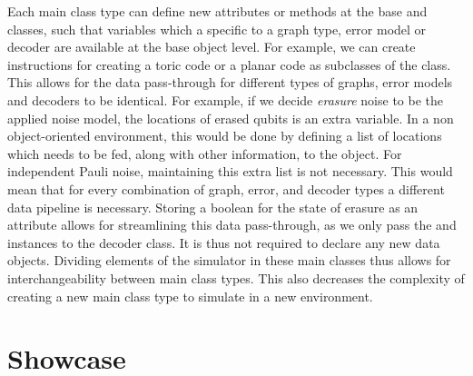Each main class type can define new attributes or methods at the base  and  classes, such that variables which a specific to a graph type, error model or decoder are available at the base object level. For example, we can create instructions for creating a toric code or a planar code as subclasses of the  class. This allows for the data pass-through for different types of graphs, error models and decoders to be identical. For example, if we decide \emph{erasure} noise to be the applied noise model, the locations of erased qubits is an extra variable. In a non object-oriented environment, this would be done by defining a list of locations which needs to be fed, along with other information, to the  object. For independent Pauli noise, maintaining this extra list is not necessary. This would mean that for every combination of graph, error, and decoder types a different data pipeline is necessary. Storing a boolean for the state of erasure as an attribute  allows for streamlining this data pass-through, as we only pass the  and  instances to the decoder class. It is thus not required to declare any new data objects. Dividing elements of the simulator in these main classes thus allows for interchangeability between main class types. This also decreases the complexity of creating a new main class type to simulate in a new environment. 


\section{Showcase}